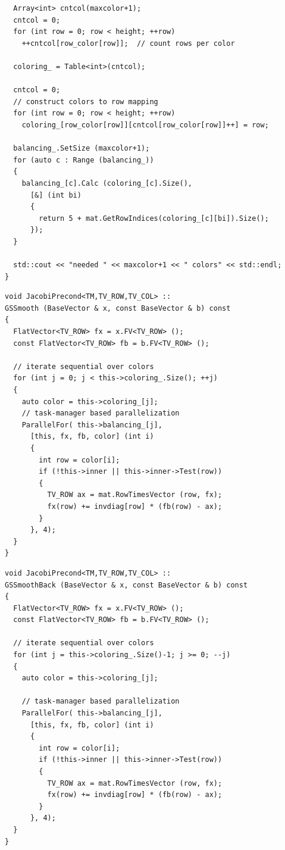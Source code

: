 \documentclass[a4paper,11pt]{scrartcl}
\begin{document}
\begin{lstlisting}
  Array<int> cntcol(maxcolor+1);
  cntcol = 0;
  for (int row = 0; row < height; ++row)
    ++cntcol[row_color[row]];  // count rows per color

  coloring_ = Table<int>(cntcol);

  cntcol = 0;
  // construct colors to row mapping
  for (int row = 0; row < height; ++row)
    coloring_[row_color[row]][cntcol[row_color[row]]++] = row;

  balancing_.SetSize (maxcolor+1);
  for (auto c : Range (balancing_))
  {
    balancing_[c].Calc (coloring_[c].Size(),
      [&] (int bi)
      {
        return 5 + mat.GetRowIndices(coloring_[c][bi]).Size();
      });
  }

  std::cout << "needed " << maxcolor+1 << " colors" << std::endl;
}

\end{lstlisting}

\begin{lstlisting}
void JacobiPrecond<TM,TV_ROW,TV_COL> ::
GSSmooth (BaseVector & x, const BaseVector & b) const
{
  FlatVector<TV_ROW> fx = x.FV<TV_ROW> ();
  const FlatVector<TV_ROW> fb = b.FV<TV_ROW> ();

  // iterate sequential over colors
  for (int j = 0; j < this->coloring_.Size(); ++j)
  {
    auto color = this->coloring_[j];
    // task-manager based parallelization
    ParallelFor( this->balancing_[j],
      [this, fx, fb, color] (int i)
      {
        int row = color[i];
        if (!this->inner || this->inner->Test(row))
        {
          TV_ROW ax = mat.RowTimesVector (row, fx);
          fx(row) += invdiag[row] * (fb(row) - ax);
        }
      }, 4);
  }
}
\end{lstlisting}

\begin{lstlisting}
void JacobiPrecond<TM,TV_ROW,TV_COL> ::
GSSmoothBack (BaseVector & x, const BaseVector & b) const
{
  FlatVector<TV_ROW> fx = x.FV<TV_ROW> ();
  const FlatVector<TV_ROW> fb = b.FV<TV_ROW> ();

  // iterate sequential over colors
  for (int j = this->coloring_.Size()-1; j >= 0; --j)
  {
    auto color = this->coloring_[j];

    // task-manager based parallelization
    ParallelFor( this->balancing_[j],
      [this, fx, fb, color] (int i)
      {
        int row = color[i];
        if (!this->inner || this->inner->Test(row))
        {
          TV_ROW ax = mat.RowTimesVector (row, fx);
          fx(row) += invdiag[row] * (fb(row) - ax);
        }
      }, 4);
  }
}
\end{lstlisting}


{}

\end{document}
